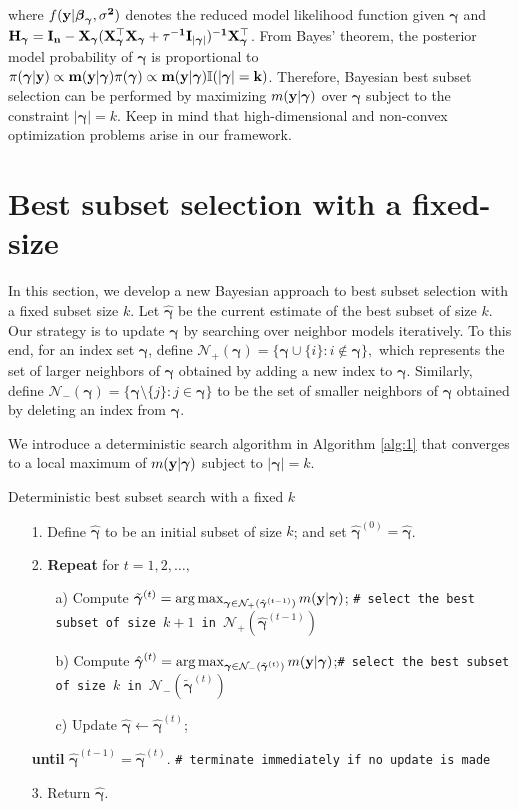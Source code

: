 \documentclass[twocolumn]{svjour3}       %
\newcommand{\T}{\top} %
\newcommand{\uI}{\bf I} %
\newcommand{\uH}{\bf H} %
\newcommand{\uX}{\bf X} %
\newcommand{\uy}{\bf y} %
\newcommand{\0}{\boldsymbol 0} %
\newcommand{\1}{\boldsymbol 1} %
\newcommand{\ubeta}{\boldsymbol \beta} %
\newcommand{\bg}{\boldsymbol \gamma} %
\begin{document}
where $f(\uy|\ubeta_{\bg},\sigma^2)$ denotes the reduced model likelihood function given $\bg$ and $\uH_{\bg} = \uI_n-\uX_{\bg}(\uX_{\bg}^{\T}\uX_{\bg}+\tau^{-1}\uI_{|\bg|})^{-1}\uX_{\bg}^{\T}$. From Bayes' theorem, the posterior model probability of $\bg$ is proportional to $\pi(\bg|\uy)\propto m(\uy|\bg) \pi(\bg)\propto m(\uy|\bg) \mathbb{I}(|\bg|=k )$. Therefore, Bayesian best subset selection can be performed by maximizing $m(\uy|\bg)$ over $\bg$ subject to the constraint $|\bg|=k$. Keep in mind that high-dimensional and non-convex optimization problems arise in our framework.

\section{Best subset selection with a fixed-size}\label{sec:3}
In this section, we develop a new Bayesian approach to best subset selection with a fixed subset size $k$. Let $\hat{\bg}$ be the current estimate of the best subset of size $k$. Our strategy is to update $\hat{\bg}$ by searching over neighbor models iteratively. To this end, for an index set $\bg$, define $\mathcal{N}_+(\bg)= \{\bg \cup \{i\}:i\notin \bg\},$ which represents the set of larger neighbors of $\bg$ obtained by adding a new index to $\bg$. Similarly, define $\mathcal{N}_-(\bg)= \{\bg \setminus \{j\}:j \in \bg\}$ to be the set of smaller neighbors of $\bg$ obtained by deleting an index from $\bg$. 

We introduce a deterministic search algorithm in Algorithm \ref{alg:1} that converges to a local maximum of $m(\uy|\bg)$ subject to $|\bg|=k$.
\begin{algorithm}[H]
\caption{Deterministic best subset search with a fixed $k$}\label{alg:1}
\begin{itemize}\itemsep=0pt
\item[1.] Define $\hat{\bg}$ to be an initial subset of size $k$; and set $\hat{\bg}^{(0)}=\hat{\bg}$.
\item[2.] \textbf{Repeat} for $t=1,2,\ldots,$
\begin{itemize}\itemsep=0pt
\item[a)] Compute $\tilde{\bg}^{(t)} = \arg\max_{\bg  \in \mathcal{N}_+(\hat{\bg}^{(t-1)} ) } m(\uy|\bg)$; \quad \texttt{\# select the best subset of size $k+1$ in $ \mathcal{N}_+(\hat{\bg}^{(t-1)})$ } 
\item[b)] Compute $\hat{\bg}^{(t)}=  \arg\max_{\bg  \in \mathcal{N}_-(\tilde{\bg}^{(t)} ) } m(\uy|\bg)$;\quad \texttt{\# select the best subset of size $k$ in $ \mathcal{N}_-(\tilde{\bg}^{(t)})$ } 
\item[c)] Update $\hat{\bg}\leftarrow \hat{\bg}^{(t)}$; 
\end{itemize}
\item[] \textbf{until} $\hat{\bg}^{(t-1)}=\hat{\bg}^{(t)}$. \quad \texttt{\# terminate immediately if no update is made}
\item[3.] Return $\hat{\bg}$.
\end{itemize}
\end{algorithm}
\end{document}
